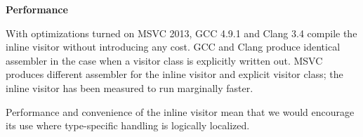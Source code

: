 \documentclass[10pt,a4paper]{article}
\renewcommand\section[1]{
    \begin{minipage}[c]{0.94\linewidth}
    \large \raggedright \sffamily \textbf{#1}
    \end{minipage}
}
\begin{document}
\section{Performance}

With optimizations turned on MSVC 2013, GCC 4.9.1 and Clang 3.4 compile the
inline visitor without introducing any cost. GCC and Clang produce identical
assembler in the case when a visitor class is explicitly written out. MSVC
produces different assembler for the inline visitor and explicit visitor class;
the inline visitor has been measured to run marginally faster.

Performance and convenience of the inline visitor mean that we would encourage
its use where type-specific handling is logically localized.
\end{document}
